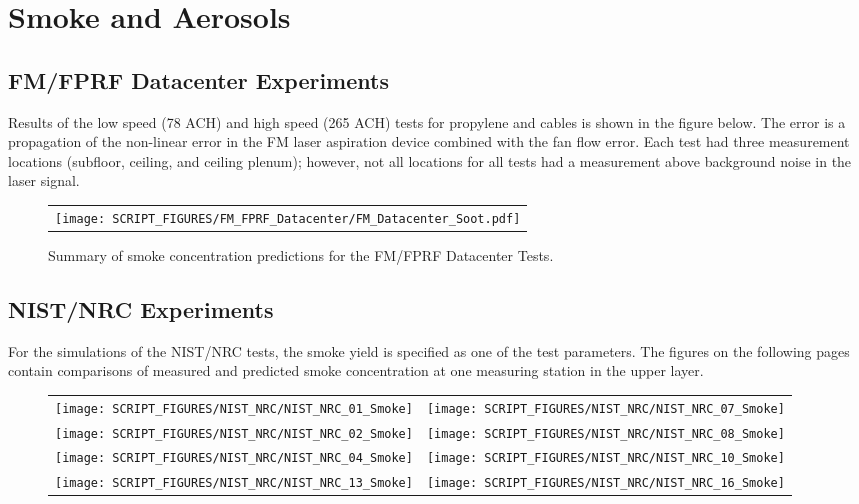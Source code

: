 \clearpage


\section{Smoke and Aerosols}

\subsection{FM/FPRF Datacenter Experiments}
\label{FM Smoke Concentration}

Results of the low speed (78 ACH) and high speed (265 ACH) tests for propylene and cables is shown in the figure below. The error is a propagation of the non-linear error in the FM laser aspiration device combined with the fan flow error. Each test had three measurement locations (subfloor, ceiling, and ceiling plenum); however, not all locations for all tests had a measurement above background noise in the laser signal.

\begin{figure}[!h]
\begin{center}
\begin{tabular}{c}
\texttt{[image: SCRIPT\_FIGURES/FM\_FPRF\_Datacenter/FM\_Datacenter\_Soot.pdf]}
\end{tabular}
\end{center}
\caption[Summary of smoke concentration predictions for the FM/FPRF Datacenter Tests]{Summary of smoke concentration predictions for the FM/FPRF Datacenter Tests.}
\end{figure}

\clearpage

\subsection{NIST/NRC Experiments}
\label{Smoke Concentration}

For the simulations of the NIST/NRC tests, the smoke yield is specified as one of the test parameters.
The figures on the following pages contain comparisons of measured and predicted smoke concentration at one measuring station in the upper layer.

\newpage

\begin{figure}[p]
\begin{tabular*}{\textwidth}{l@{\extracolsep{\fill}}r}
\texttt{[image: SCRIPT\_FIGURES/NIST\_NRC/NIST\_NRC\_01\_Smoke]} &
\texttt{[image: SCRIPT\_FIGURES/NIST\_NRC/NIST\_NRC\_07\_Smoke]} \\
\texttt{[image: SCRIPT\_FIGURES/NIST\_NRC/NIST\_NRC\_02\_Smoke]} &
\texttt{[image: SCRIPT\_FIGURES/NIST\_NRC/NIST\_NRC\_08\_Smoke]} \\
\texttt{[image: SCRIPT\_FIGURES/NIST\_NRC/NIST\_NRC\_04\_Smoke]} &
\texttt{[image: SCRIPT\_FIGURES/NIST\_NRC/NIST\_NRC\_10\_Smoke]} \\
\texttt{[image: SCRIPT\_FIGURES/NIST\_NRC/NIST\_NRC\_13\_Smoke]} &
\texttt{[image: SCRIPT\_FIGURES/NIST\_NRC/NIST\_NRC\_16\_Smoke]}
\end{tabular*}
\end{figure}


